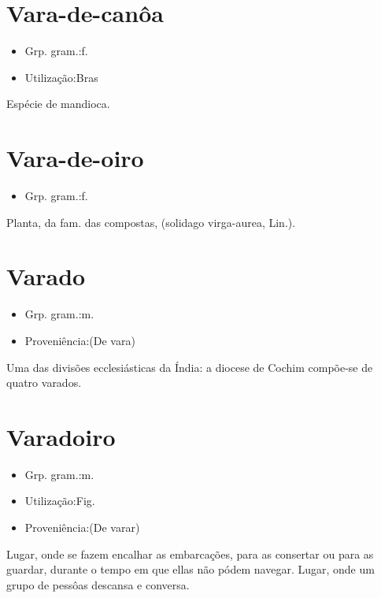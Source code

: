 \documentclass{article}
\begin{document}
\section{Vara-de-canôa}
\begin{itemize}
\item {Grp. gram.:f.}
\end{itemize}
\begin{itemize}
\item {Utilização:Bras}
\end{itemize}
Espécie de mandioca.
\section{Vara-de-oiro}
\begin{itemize}
\item {Grp. gram.:f.}
\end{itemize}
Planta, da fam. das compostas, (\textunderscore solidago virga-aurea\textunderscore , Lin.).
\section{Varado}
\begin{itemize}
\item {Grp. gram.:m.}
\end{itemize}
\begin{itemize}
\item {Proveniência:(De \textunderscore vara\textunderscore )}
\end{itemize}
Uma das divisões ecclesiásticas da Índia: \textunderscore a diocese de Cochim compõe-se de quatro varados\textunderscore .
\section{Varadoiro}
\begin{itemize}
\item {Grp. gram.:m.}
\end{itemize}
\begin{itemize}
\item {Utilização:Fig.}
\end{itemize}
\begin{itemize}
\item {Proveniência:(De \textunderscore varar\textunderscore )}
\end{itemize}
Lugar, onde se fazem encalhar as embarcações, para as consertar ou para as guardar, durante o tempo em que ellas não pódem navegar.
Lugar, onde um grupo de pessôas descansa e conversa.
\end{document}
